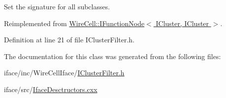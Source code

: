 Set the signature for all subclasses. 



Reimplemented from \hyperlink{class_wire_cell_1_1_i_function_node_af59f46cf19ca9fdf4aade1f289feedf2}{Wire\+Cell\+::\+I\+Function\+Node$<$ I\+Cluster, I\+Cluster $>$}.



Definition at line 21 of file I\+Cluster\+Filter.\+h.



The documentation for this class was generated from the following files\+:\begin{DoxyCompactItemize}
\item 
iface/inc/\+Wire\+Cell\+Iface/\hyperlink{_i_cluster_filter_8h}{I\+Cluster\+Filter.\+h}\item 
iface/src/\hyperlink{_iface_desctructors_8cxx}{Iface\+Desctructors.\+cxx}\end{DoxyCompactItemize}
